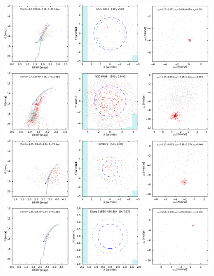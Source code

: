 \documentclass[usenatbib]{mnras}
\begin{document}
\clearpage\begin{figure}
\contcaption{}
\includegraphics{figs/NGC_6453.pdf}
\includegraphics{figs/NGC_6496.pdf}
\includegraphics{figs/Terzan_9.pdf}
\includegraphics{figs/Djorg_2_ESO456-.pdf}
\end{figure}
\end{document}
